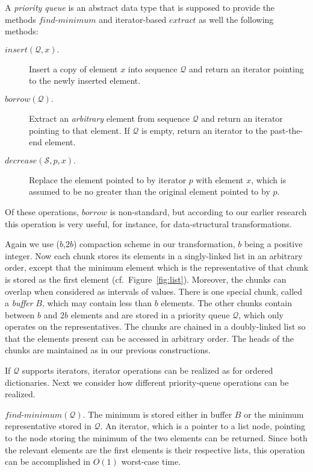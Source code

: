 \documentclass{DIKU-article}
\newcommand{\Findmin}{\mbox{$\mathit{find}$\textnormal{-}}\allowbreak{}\mbox{$\mathit{minimum}$}}
\newcommand{\Insert}{\mbox{$\mathit{insert}$}}
\newcommand{\Extract}{\mbox{$\mathit{extract}$}}
\newcommand{\Decrease}{\mbox{$\mathit{decrease}$}}
\newcommand{\Borrow}{\mbox{$\mathit{borrow}$}}
\begin{document}
A \emph{priority queue} is an abstract data type that is supposed to
provide the methods \Findmin{} and iterator-based \Extract{} as well
the following methods:
\begin{description}
\item[\Insert{}$(\mathcal{Q}, x).$] Insert a copy of element $x$ into sequence $\mathcal{Q}$ and return an iterator pointing to the newly inserted
element.

\item[\Borrow{}$(\mathcal{Q}).$] Extract an \emph{arbitrary} element from
sequence $\mathcal{Q}$ and return an iterator pointing to that element. If $\mathcal{Q}$
is empty, return an iterator to the past-the-end element.

\item[\Decrease{}$(\mathcal{S}, p, x).$] Replace the element pointed to by
iterator $p$ with element $x$, which is assumed to be no greater than
the original element pointed to by $p$.
\end{description}
Of these operations, \Borrow{} is non-standard, but according to our
earlier research \cite{EJK04,EJK07} this operation is very useful, for
instance, for data-structural transformations.

Again we use ($b$,$2b$) compaction scheme in our transformation, $b$
being a positive integer. Now each chunk stores its elements in a
singly-linked list in an arbitrary order, except that the minimum
element which is the representative of that chunk is stored as the
first element (cf.~Figure~\ref{fig:list}).  Moreover, the chunks can
overlap when considered as intervals of values.  There is one special
chunk, called a \emph{buffer} $B$, which may contain less than $b$
elements. The other chunks contain between $b$ and $2b$ elements and
are stored in a priority queue $\mathcal{Q}$, which only operates on
the representatives. The chunks are chained in a doubly-linked list so
that the elements present can be accessed in arbitrary order. 
The heads of the chunks are maintained as in our previous constructions.

If $\mathcal{Q}$ supports
iterators, iterator operations can be realized as for ordered
dictionaries.  Next we consider how different priority-queue
operations can be realized.

\Findmin{}$(\mathcal{Q})$. The minimum is stored either in buffer $B$ or the
minimum representative stored in $\mathcal{Q}$. An iterator, which is a pointer to a list
node, pointing to the node storing the minimum of the two elements can
be returned. Since both the relevant elements are the first elements
is their respective lists, this operation can be accomplished in
$O(1)$ worst-case time.
\end{document}
